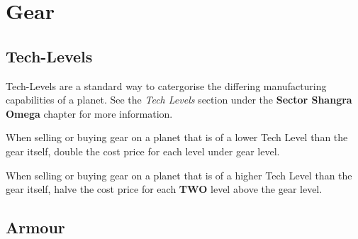 
\section{Gear}

\subsection{Tech-Levels}
  
Tech-Levels are a standard way to catergorise the differing manufacturing capabilities of a planet. See the \textit{Tech Levels} section under the \textbf{Sector Shangra Omega} chapter for more information.

When selling or buying gear on a planet that is of a lower Tech Level than the gear itself, double the cost price for each level under gear level.

When selling or buying gear on a planet that is of a higher Tech Level than the gear itself, halve the cost price for each \textbf{TWO} level above the gear level.

\subsection{Armour}

